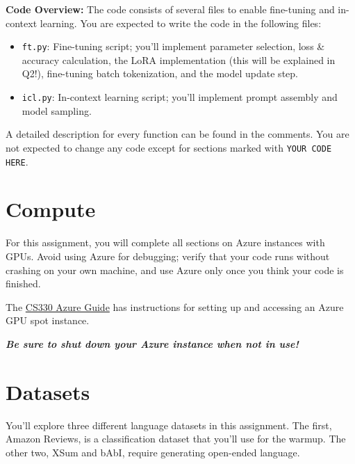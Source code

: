 \documentclass[12pt]{article}
\begin{document}
\textbf{Code Overview:} The code consists of several files to enable fine-tuning and in-context learning. You are expected to write the code in the following files:
\begin{itemize}
    \item \texttt{ft.py}: Fine-tuning script; you'll implement parameter selection, loss \& accuracy calculation, the LoRA implementation (this will be explained in Q2!), fine-tuning batch tokenization, and the model update step.
    \item \texttt{icl.py}: In-context learning script; you'll implement prompt assembly and model sampling.
\end{itemize}

A detailed description for every function can be found in the comments. You are not expected to change any code except for sections marked with \texttt{YOUR CODE HERE}.

\section*{Compute}

For this assignment, you will complete all sections on Azure instances with GPUs. Avoid using Azure for debugging; verify that your code runs without crashing on your own machine, and use Azure only once you think your code is finished.

The \href{https://docs.google.com/document/d/10DZEFQA9qAZNMEGcrhsJ6fV_5IshbsCabMco1rKpleg/edit#}{CS330 Azure Guide} has instructions for setting up and accessing an Azure GPU spot instance.

{
\begin{center}
\large
    \textbf{\textit{Be sure to shut down your Azure instance when not in use!}}
\end{center} 
}

\section*{Datasets}

You'll explore three different language datasets in this assignment. The first, Amazon Reviews, is a classification dataset that you'll use for the warmup. The other two, XSum and bAbI, require generating open-ended language.
\end{document}
